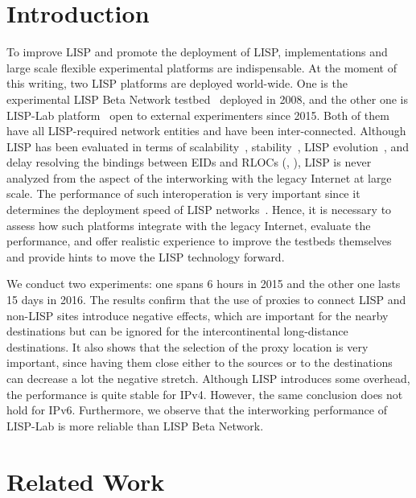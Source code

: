 \section{Introduction}
\label{sec:pxtr_intro}
To improve LISP and promote the deployment of LISP, implementations and large scale flexible experimental platforms are indispensable. At the moment of this writing, two LISP platforms are deployed world-wide. One is the experimental LISP Beta Network testbed~\cite{lispbeta} deployed in 2008, and the other one is LISP-Lab platform~\cite{lisplab} open to external experimenters since 2015. Both of them have all LISP-required network entities and have been inter-connected. Although LISP has been evaluated in terms of scalability~\cite{lispCCR}, stability~\cite{yue2016stability}, LISP evolution~\cite{li2017lisp}, and delay resolving the bindings between EIDs and RLOCs (\cite{lispCCR}, \cite{coras2014performance}), LISP is never analyzed from the aspect of the interworking with the legacy Internet at large scale. The performance of such interoperation is very important since it determines the deployment speed of LISP networks~\cite{feng2017locator}. Hence, it is necessary to assess how such platforms integrate with the legacy Internet, evaluate the performance, and offer realistic experience to improve the testbeds themselves and provide hints to move the LISP technology forward.

We conduct two experiments: one spans 6 hours in 2015 and the other one lasts 15 days in 2016. The results confirm that the use of proxies to connect LISP and non-LISP sites introduce negative effects, which are important for the nearby destinations but can be ignored for the intercontinental long-distance destinations. It also shows that the selection of the proxy location is very important, since having them close either to the sources or to the destinations can decrease a lot the negative stretch. Although LISP introduces some overhead, the performance is quite stable for IPv4. However, the same conclusion does not hold for IPv6. Furthermore, we observe that the interworking performance of LISP-Lab is more reliable than LISP Beta Network.

\section{Related Work}
